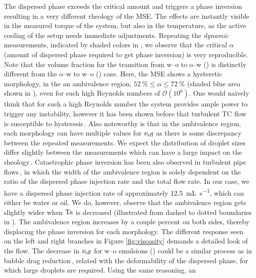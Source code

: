 The dispersed phase exceeds the critical amount and triggers a phase
inversion resulting in a very different rheology of the MSE.
The effects are instantly visible in the measured torque of the system, but
also in the temperature, as the active cooling of the setup needs immediate
adjustments.
Repeating the \emph{dynamic} measurements, indicated by shaded colors in
, we observe that the critical $\alpha$ (amount of
dispersed phase required to get phase inversion) is very reproducible.
Note that the volume fraction for the transition from w--o to o--w
() is distinctly different from the o--w to w--o
() case.
Here, the MSE shows a hysteretic morphology, in the an ambivalence region,
$\SI{52}{\percent} \leq \alpha \leq \SI{72}{\percent}$ (shaded blue area
shown in ), even for such high Reynolds numbers of
$\mathcal{O}(10^6)$.
One would naively think that for such a high Reynolds number the system
provides ample power to trigger any instability, however it has been shown
before that turbulent TC flow is susceptible to hysteresis\,\cite{Huisman2014,
vanderVeen2016}.
Also noteworthy is that in the ambivalence region, each morphology can
have multiple values for $\nu_\text{eff}$ as there is some discrepancy between the
repeated measurements.
We expect the distribution of droplet sizes differ slightly between the
measurements which can have a large impact on the rheology\,\cite{Pal1996}.
%
Catastrophic phase inversion has been also observed in turbulent pipe flows\,\cite{Piela2006,Piela2008}, in which the width of the ambivalence region is solely dependent on the ratio of the dispersed phase injection rate and the 
total flow rate.  In our case, we have a dispersed phase
injection rate of approximately \SI{12.5}{\milli\liter\per\second}, which can
either be water or oil.
We do, however, observe that the ambivalence region gets slightly
wider when $\text{Ta}$ is decreased (illustrated from dashed to dotted boundaries in
).
The ambivalence region increases by a couple percent on both sides, thereby
displacing the phase inversion for each morphology.
The different response seen on the left and right branches in Figure \ref{fig:viscosity} demands a detailed
look of the flow. The decrease in $\nu_\text{eff}$ for w--o emulsions ()
could be a similar process as in bubble drag
reduction\,\cite{vandenBerg2007,Verschoof2016}, related with the deformability of the dispersed phase, for which large droplets are required.  Using the same reasoning, an

